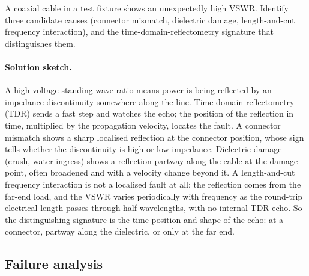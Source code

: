 \begin{exercise}
A coaxial cable in a test fixture shows an unexpectedly high VSWR.
Identify three candidate causes (connector mismatch, dielectric
damage, length-and-cut frequency interaction), and the
time-domain-reflectometry signature that distinguishes them.

\paragraph{Solution sketch.} A high voltage standing-wave ratio means
power is being reflected by an impedance discontinuity somewhere along
the line. Time-domain reflectometry (TDR) sends a fast step and watches
the echo; the position of the reflection in time, multiplied by the
propagation velocity, locates the fault. A connector mismatch shows a
sharp localised reflection at the connector position, whose sign tells
whether the discontinuity is high or low impedance. Dielectric damage
(crush, water ingress) shows a reflection partway along the cable at the
damage point, often broadened and with a velocity change beyond it.
A length-and-cut frequency interaction is not a localised fault at all:
the reflection comes from the far-end load, and the VSWR varies
periodically with frequency as the round-trip electrical length passes
through half-wavelengths, with no internal TDR echo. So the
distinguishing signature is the time position and shape of the echo:
at a connector, partway along the dielectric, or only at the far end.
\end{exercise}

\subsection*{Failure analysis}

